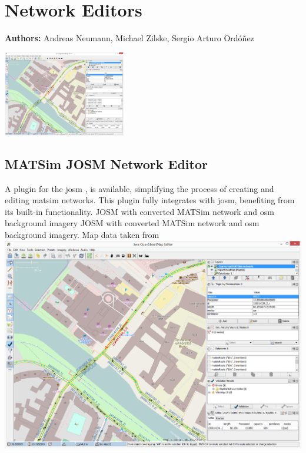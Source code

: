 \chapter{Network Editors}
\label{ch:networkeditor}

\hfill \textbf{Authors:} Andreas Neumann, Michael Zilske, Sergio Arturo Ordóñez


\begin{center} \includegraphics[width=0.4\textwidth, angle=0]{extending/figures/networkeditor/josm_screenshot} \end{center}

\section{MATSim JOSM Network Editor}
A plugin for the \gls{josm} \citep[][]{JOSM2014}, is available, simplifying the process of creating and editing \gls{matsim} networks. This plugin fully integrates with \gls{josm}, benefiting from its built-in functionality.
%
\createfigure
{JOSM with converted MATSim network and \protect\gls{osm} background imagery}
{JOSM with converted MATSim network and \protect\gls{osm} background imagery. Map data taken from \citet[][]{OpenStreetMap2014}}
{\label{fig:networkeditor_screenshot}}
{\includegraphics[width=1.0\textwidth]{extending/figures/networkeditor/josm_screenshot}}
{}

